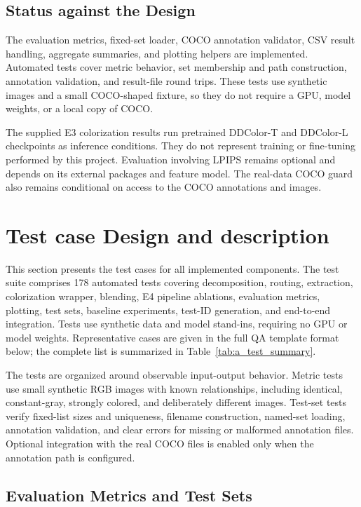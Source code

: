 \documentclass{FastFyp}
\begin{document}
\subsection{Status against the Design}
\label{status}

The evaluation metrics, fixed-set loader, COCO annotation validator, CSV
result handling, aggregate summaries, and plotting helpers are implemented.
Automated tests cover metric behavior, set membership and path construction,
annotation validation, and result-file round trips. These tests use synthetic
images and a small COCO-shaped fixture, so they do not require a GPU, model
weights, or a local copy of COCO.

The supplied E3 colorization results run pretrained DDColor-T and DDColor-L
checkpoints as inference conditions. They do not represent training or
fine-tuning performed by this project. Evaluation involving LPIPS remains
optional and depends on its external packages and feature model. The real-data
COCO guard also remains conditional on access to the COCO annotations and
images.
\iffalse
\section{Test case Design and description}
This section presents the test cases for all implemented components. The test suite comprises 178 automated tests covering decomposition, routing, extraction, colorization wrapper, blending, E4 pipeline ablations, evaluation metrics, plotting, test sets, baseline experiments, test-ID generation, and end-to-end integration. Tests use synthetic data and model stand-ins, requiring no GPU or model weights. Representative cases are given in the full QA template format below; the complete list is summarized in Table~\ref{tab:a_test_summary}.

The tests are organized around observable input-output behavior. Metric tests
use small synthetic RGB images with known relationships, including identical,
constant-gray, strongly colored, and deliberately different images. Test-set
tests verify fixed-list sizes and uniqueness, filename construction, named-set
loading, annotation validation, and clear errors for missing or malformed
annotation files. Optional integration with the real COCO files is enabled
only when the annotation path is configured.

\subsection{Evaluation Metrics and Test Sets}
\label{subsubsec:person-c-test-cases}
\end{document}
